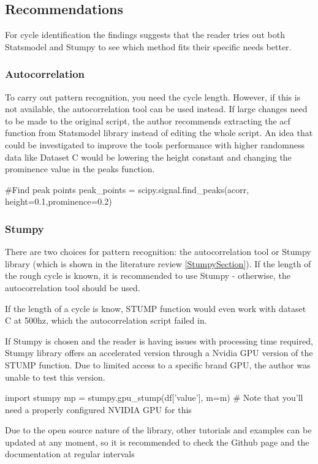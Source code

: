 \subsection{Recommendations}
For cycle identification the findings suggests that the reader tries out both Statsmodel and Stumpy to see which method fits their specific needs better. 
\subsubsection{Autocorrelation}
To carry out pattern recognition, you need the cycle length. However, if this is not available, the autocorrelation tool can be used instead.  If large changes need to be made to the original script, the author recommends extracting the acf function from Statsmodel library instead of editing the whole script. 
An idea that could be investigated to improve the tools performance with higher randomness data like Dataset C would be lowering the height constant and changing the prominence value in the peaks function. 

\begin{python}
#Find peak points
peak_points = scipy.signal.find_peaks(acorr, height=0.1,prominence=0.2)
\end{python}

\subsubsection{Stumpy}
There are two choices for pattern recognition: the autocorrelation tool or Stumpy library (which is shown in the literature review \ref{StumpySection}). If the length of the rough cycle is known, it is recommended to use Stumpy - otherwise, the autocorrelation tool should be used. 

If the length of a cycle is know, STUMP function would even work with dataset C at 500hz, which the autocorrelation script failed in.

If Stumpy is chosen and the reader is having issues with processing time required, Stumpy library offers an accelerated version through a Nvidia GPU version of the STUMP function. Due to limited access to a specific brand GPU, the author was unable to test this version. 
\begin{python}
import stumpy
mp = stumpy.gpu_stump(df['value'], m=m)  
# Note that you'll need a properly configured NVIDIA GPU for this
\end{python}

Due to the open source nature of the library, other tutorials and examples can be updated at any moment, so it is recommended to check the Github page and the documentation at regular intervals  \cite{law2019stumpy}

